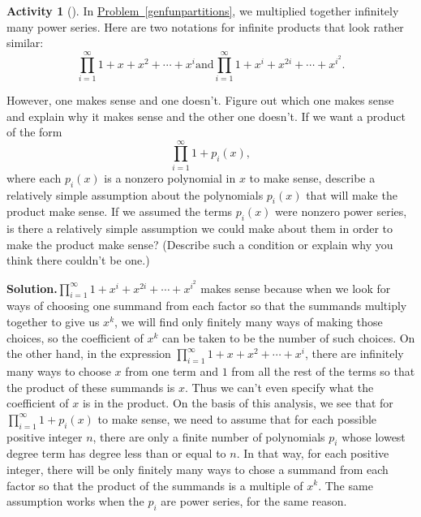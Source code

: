 \documentclass[10pt,]{book}
\theoremstyle{plain}
\theoremstyle{definition}
\newtheorem{activity}[project]{Activity}
\numberwithin{equation}{chapter}
\begin{document}
\begin{activity}[]\label{activity-177}
In \hyperref[genfunpartitions]{Problem~\ref{genfunpartitions}}, we multiplied together infinitely many power series. Here are two notations for infinite products that look rather similar:%
\begin{equation*}
\prod_{i=1}^\infty 1 + x + x^2 +\cdots+ x^i\mbox{and}
\prod_{i=1}^\infty 1 +x^i +x^{2i} +\cdots + x^{i^2}.
\end{equation*}
%
\par
However, one makes sense and one doesn't. Figure out which one makes sense and explain why it makes sense and the other one doesn't. If we want a product of the form%
\begin{equation*}
\prod_{i=1}^\infty 1 +p_i(x),
\end{equation*}
where each \(p_i(x)\) is a nonzero polynomial in \(x\) to make sense, describe a relatively simple assumption about the polynomials \(p_i(x)\) that will make the product make sense. If we assumed the terms \(p_i(x)\) were nonzero power series, is there a relatively simple assumption we could make about them in order to make the product make sense? (Describe such a condition or explain why you think there couldn't be one.)%
\par\medskip\noindent%
\textbf{Solution.}\quad \(\prod_{i=1}^\infty 1 +x^i +x^{2i} +\cdots + x^{i^2}\) makes sense because when we look for ways of choosing one summand from each factor so that the summands multiply together to give us \(x^k\), we will find only finitely many ways of making those choices, so the coefficient of \(x^k\) can be taken to be the number of such choices. On the other hand, in the expression \(\prod_{i=1}^\infty 1 + x + x^2 +\cdots+ x^i\), there are infinitely many ways to choose \(x\) from one term and \(1\) from all the rest of the terms so that the product of these summands is \(x\). Thus we can't even specify what the coefficient of \(x\) is in the product. On the basis of this analysis, we see that for \(\prod_{i=1}^\infty 1 +p_i(x)\) to make sense, we need to assume that for each possible positive integer \(n\), there are only a finite number of polynomials \(p_i\) whose lowest degree term has degree less than or equal to \(n\). In that way, for each positive integer, there will be only finitely many ways to chose a summand from each factor so that the product of the summands is a multiple of \(x^k\). The same assumption works when the \(p_i\) are power series, for the same reason.%
\end{activity}
\end{document}
